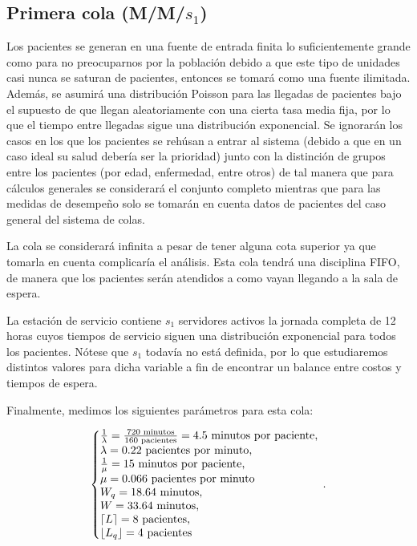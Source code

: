 \documentclass[10pt]{article}
\begin{document}
    \subsection{Primera cola (M/M/$s_{1}$)}
    Los pacientes se generan en una fuente de entrada finita lo suficientemente grande como para no preocuparnos por la población debido a que este tipo de unidades casi nunca se saturan de pacientes, entonces se tomará como una fuente ilimitada. Además, se asumirá una distribución Poisson para las llegadas de pacientes bajo el supuesto de que llegan aleatoriamente con una cierta tasa media fija, por lo que el tiempo entre llegadas sigue una distribución exponencial. Se ignorarán los casos en los que los pacientes se rehúsan a entrar al sistema (debido a que en un caso ideal su salud debería ser la prioridad) junto con la distinción de grupos entre los pacientes (por edad, enfermedad, entre otros) de tal manera que para cálculos generales se considerará el conjunto completo mientras que para las medidas de desempeño solo se tomarán en cuenta datos de pacientes del caso general del sistema de colas. \par
    La cola se considerará infinita a pesar de tener alguna cota superior ya que tomarla en cuenta complicaría el análisis. Esta cola tendrá una disciplina FIFO, de manera que los pacientes serán atendidos a como vayan llegando a la sala de espera. \par
    La estación de servicio contiene $s_{1}$ servidores activos la jornada completa de 12 horas cuyos tiempos de servicio siguen una distribución exponencial para todos los pacientes. Nótese que $s_{1}$ todavía no está definida, por lo que estudiaremos distintos valores para dicha variable a fin de encontrar un balance entre costos y tiempos de espera. \par
    Finalmente, medimos los siguientes parámetros para esta cola: \par
    
    \begin{equation*}
    	\left\{
    		\begin{array}{@{}l@{}}
	    		\frac{1}{\lambda} = \frac{720 \text{ minutos}}{160 \text{ pacientes}} = 4.5 \text{ minutos por paciente,} \\
	    		\lambda = 0.22 \text{ pacientes por minuto,} \\
	    		\frac{1}{\mu} = 15 \text{ minutos por paciente,} \\
	    		\mu = 0.066 \text{ pacientes por minuto} \\
	    		W_{q} = 18.64 \text{ minutos,} \\
	    		W = 33.64 \text{ minutos,} \\
	    		\left\lceil L \right\rceil = 8 \text{ pacientes,} \\
	    		\left\lfloor L_{q} \right\rfloor = 4 \text{ pacientes}
    		\end{array}
   		\right.\,.
    \end{equation*}
    
\end{document}
